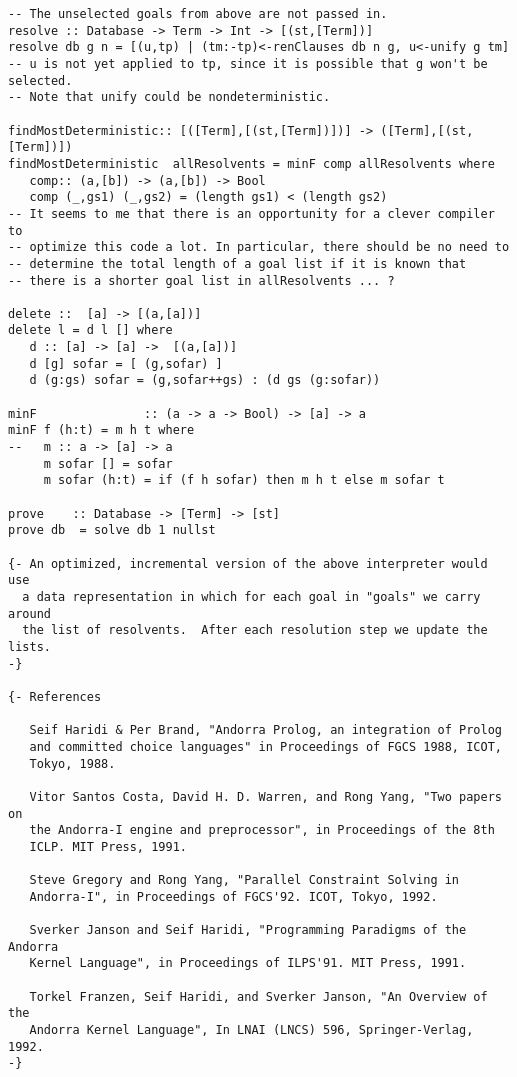 \documentclass[thesis-solanki.tex]{files}
\begin{document}
\begin{verbatim}
-- The unselected goals from above are not passed in.
resolve :: Database -> Term -> Int -> [(st,[Term])]
resolve db g n = [(u,tp) | (tm:-tp)<-renClauses db n g, u<-unify g tm]
-- u is not yet applied to tp, since it is possible that g won't be selected.
-- Note that unify could be nondeterministic.

findMostDeterministic:: [([Term],[(st,[Term])])] -> ([Term],[(st,[Term])])
findMostDeterministic  allResolvents = minF comp allResolvents where
   comp:: (a,[b]) -> (a,[b]) -> Bool
   comp (_,gs1) (_,gs2) = (length gs1) < (length gs2)
-- It seems to me that there is an opportunity for a clever compiler to
-- optimize this code a lot. In particular, there should be no need to
-- determine the total length of a goal list if it is known that
-- there is a shorter goal list in allResolvents ... ?

delete ::  [a] -> [(a,[a])]
delete l = d l [] where
   d :: [a] -> [a] ->  [(a,[a])]
   d [g] sofar = [ (g,sofar) ]
   d (g:gs) sofar = (g,sofar++gs) : (d gs (g:sofar))

minF               :: (a -> a -> Bool) -> [a] -> a
minF f (h:t) = m h t where
--   m :: a -> [a] -> a
     m sofar [] = sofar
     m sofar (h:t) = if (f h sofar) then m h t else m sofar t

prove    :: Database -> [Term] -> [st]
prove db  = solve db 1 nullst

{- An optimized, incremental version of the above interpreter would use
  a data representation in which for each goal in "goals" we carry around
  the list of resolvents.  After each resolution step we update the lists.
-}

{- References

   Seif Haridi & Per Brand, "Andorra Prolog, an integration of Prolog
   and committed choice languages" in Proceedings of FGCS 1988, ICOT,
   Tokyo, 1988.

   Vitor Santos Costa, David H. D. Warren, and Rong Yang, "Two papers on
   the Andorra-I engine and preprocessor", in Proceedings of the 8th
   ICLP. MIT Press, 1991.

   Steve Gregory and Rong Yang, "Parallel Constraint Solving in
   Andorra-I", in Proceedings of FGCS'92. ICOT, Tokyo, 1992.

   Sverker Janson and Seif Haridi, "Programming Paradigms of the Andorra
   Kernel Language", in Proceedings of ILPS'91. MIT Press, 1991.

   Torkel Franzen, Seif Haridi, and Sverker Janson, "An Overview of the
   Andorra Kernel Language", In LNAI (LNCS) 596, Springer-Verlag, 1992.
-}
\end{verbatim}
\end{document}

